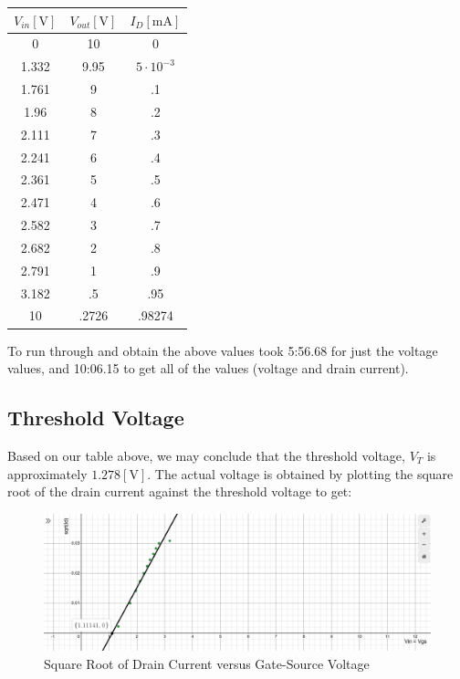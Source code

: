 \documentclass[
	letterpaper, %
	10pt, %
]{CSUniSchoolLabReport}
\begin{document}
\begin{center}
  \begin{tabular}[H]{|c|c|c|}
    \hline
    $V_{in}[\si{\volt}]$ & $V_{out}[\si{\volt}]$ & $I_D[\si{\milli\ampere}]$\\
    \hline
    0 & 10 & 0\\
    \hline
    1.332 & 9.95 & $5\cdot10^{-3}$\\
    \hline
    1.761 & 9 & .1\\
    \hline
    1.96 & 8 & .2\\
    \hline
    2.111 & 7 & .3\\
    \hline
    2.241 & 6 & .4\\
    \hline
    2.361 & 5 & .5\\
    \hline
    2.471 & 4 & .6\\
    \hline
    2.582 & 3 & .7\\
    \hline
    2.682 & 2 & .8\\
    \hline
    2.791 & 1 & .9\\
    \hline
    3.182 & .5 & .95\\
    \hline
    10 & .2726 & .98274\\
    \hline
  \end{tabular}
\end{center}

To run through and obtain the above values took 5:56.68 for just the voltage values, and 10:06.15 to get all of the values (voltage and drain current).

\subsection{Threshold Voltage}

Based on our table above, we may conclude that the threshold voltage, $V_T$ is approximately $1.278[\si{\volt}]$. The actual voltage is obtained by plotting the square root of the drain current against the threshold voltage to get:

\begin{figure}[H]
  \centering
  \includegraphics[width=.9\textwidth]{Figures/L5F2}
  \caption{Square Root of Drain Current versus Gate-Source Voltage}
  \label{fig:2}
\end{figure}
\end{document}

